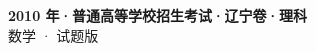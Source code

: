 \documentclass[zihao=-4, a4paper]{ctexart}
\begin{document}
\begin{center}
  {\Large\bfseries 2010 年·普通高等学校招生考试·辽宁卷·理科}\\[4pt]
  {\large 数学 · 试题版}
\end{center}
\medskip
{}

\end{document}
